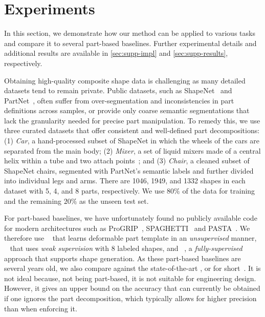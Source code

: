 
\section{Experiments}
\label{sec:experiments}



In this section, we  demonstrate how our method can be applied to various tasks and compare it to several part-based baselines.
Further experimental details and additional results are available in \cref{sec:supp-impl} and \ref{sec:supp-results}, respectively.

 Obtaining high-quality composite shape data is challenging as many detailed datasets tend to remain private. Public datasets, such as ShapeNet~\cite{Chang15} and PartNet~\cite{Mo19}, often suffer from over-segmentation and inconsistencies in part definitions across samples, or provide only coarse semantic segmentations that lack the granularity needed for precise part manipulation. To remedy this, we use three curated datasets that offer consistent and well-defined part decompositions: (1) \textit{Car}, a hand-processed subset of ShapeNet in which the wheels of the cars are separated from the main body; (2) \textit{Mixer}, a set of  liquid mixers made of a central helix within a tube and two attach points~\cite{Vasu22}; and (3) \textit{Chair}, a cleaned subset of ShapeNet chairs, segmented with PartNet’s semantic labels and further divided into individual legs and arms. There are 1046, 1949, and 1332 shapes in each dataset with 5, 4, and 8 parts, respectively. We use $80\%$ of the data for training and the remaining $20\%$ as the unseen test set.

%
For part-based baselines, we have unfortunately found no publicly available code for modern architectures such as ProGRIP~\cite{Deng22b}, SPAGHETTI~\cite{Hertz22} and PASTA~\cite{Li24c}. We therefore use \DAENET~\cite{Chen24b} that learns deformable part template in an \textit{unsupervised} manner, \BAENET~\cite{Chen19i} that uses \textit{weak supervision} with 8 labeled shapes, and \PQNET~\cite{Wu20c}, a \textit{fully-supervised} approach that supports shape generation. 
As these part-based baselines are several years old, we also compare against the state-of-the-art \VecSet{}, or \VecSetShort{} for short~\cite{Zhang23d}. It is not ideal because, not being part-based, it is not suitable for engineering design. However, it gives an upper bound on the accuracy that can currently be obtained if one ignores the part decomposition, which typically allows for higher precision than when enforcing it. 


